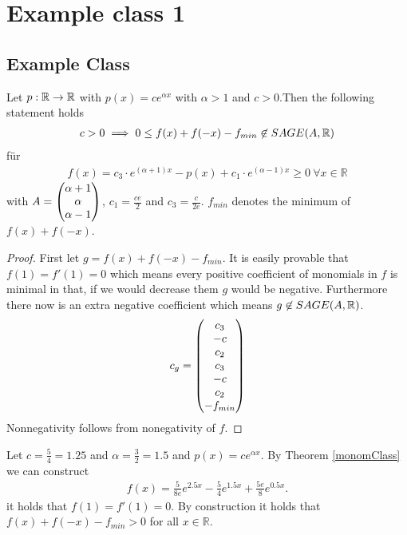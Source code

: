 \documentclass[./main.tex]{subfiles}
\begin{document}
\section{Example class 1}
\subsection{Example Class}
\begin{thm}
\label{monomClass}
Let $p: \mathbb{R} \rightarrow \mathbb{R}$ with $p(x) = c e^{\alpha x}$ with $\alpha >1$ and $c>0$.Then the following statement holds
\begin{align*}
c> 0 \implies  0 \leq f(x)+f(-x)-f_{min} \not\in SAGE(A,\mathbb{R})
\end{align*}
für
\begin{align*}
f(x) = c_3 \cdot e^{(\alpha +1) x} -p(x) + c_1 \cdot e^{(\alpha -1) x} \geq 0 \ \forall x \in \mathbb{R}
\end{align*}
with $A = \begin{pmatrix}\alpha +1 \\ \alpha \\ \alpha -1 \end{pmatrix}$, $c_1 = \frac {c e} {2} $ and $c_3 = \frac {c} {2 e}$. $f_{min}$ denotes the minimum of $f(x)+f(-x)$.
\begin{proof} First let $g=f(x)+f(-x)-f_{min}$. It is easily provable that  $f(1)=f'(1)=0$ which means every positive coefficient of monomials in $f$ is minimal in that, if we would decrease them $g$ would be negative. Furthermore there now is an extra negative coefficient which means $g\not \in SAGE(A,\mathbb{R})$. 
\begin{align*}
c_g=\begin{pmatrix}c_3\\-c\\c_2\\c_3\\-c\\c_2\\-f_{min}\end{pmatrix}
\end{align*}
Nonnegativity follows from nonegativity of $f$.
\end{proof}
\end{thm}
\begin{bsp}
Let $c=\frac 5 4 =1.25$ and $\alpha = \frac 3 2 = 1.5$ and $p(x)=ce^{\alpha x}$. By Theorem \ref{monomClass} we can construct
\begin{align*}
f(x)= \frac{5}{8e}e^{2.5x} -\frac 5 4 e^{1.5x}+\frac{5e}{8}e^{0.5x}.
\end{align*}
it holds that $f(1)=f'(1)=0$. By construction it holds that $f(x)+f(-x)-f_{min}>0$ for all $x \in \mathbb{R}$.
\end{bsp}
\end{document}
